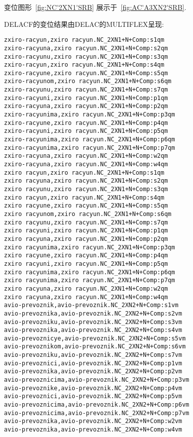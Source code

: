 \bigskip
\noindent 变位图形~\ref{fig:NC'2XN1'SRB} 展示于~\ref{fig:AC'A3XN2'SRB}. 

\bigskip
\noindent DELACF的变位结果由DELAC的MULTIFLEX呈现:

\footnotesize
\begin{verbatim}
zxiro-racyun,zxiro racyun.NC_2XN1+N+Comp:s1qm
zxiro-racyuna,zxiro racyun.NC_2XN1+N+Comp:s2qm
zxiro-racyunu,zxiro racyun.NC_2XN1+N+Comp:s3qm
zxiro-racyun,zxiro racyun.NC_2XN1+N+Comp:s4qm
zxiro-racyune,zxiro racyun.NC_2XN1+N+Comp:s5qm
zxiro-racyunom,zxiro racyun.NC_2XN1+N+Comp:s6qm
zxiro-racyunu,zxiro racyun.NC_2XN1+N+Comp:s7qm
zxiro-racyuni,zxiro racyun.NC_2XN1+N+Comp:p1qm
zxiro-racyuna,zxiro racyun.NC_2XN1+N+Comp:p2qm
zxiro-racyunima,zxiro racyun.NC_2XN1+N+Comp:p3qm
zxiro-racyune,zxiro racyun.NC_2XN1+N+Comp:p4qm
zxiro-racyuni,zxiro racyun.NC_2XN1+N+Comp:p5qm
zxiro-racyunima,zxiro racyun.NC_2XN1+N+Comp:p6qm
zxiro-racyunima,zxiro racyun.NC_2XN1+N+Comp:p7qm
zxiro-racyuna,zxiro racyun.NC_2XN1+N+Comp:w2qm
zxiro-racyuna,zxiro racyun.NC_2XN1+N+Comp:w4qm
zxiro racyun,zxiro racyun.NC_2XN1+N+Comp:s1qm
zxiro racyuna,zxiro racyun.NC_2XN1+N+Comp:s2qm
zxiro racyunu,zxiro racyun.NC_2XN1+N+Comp:s3qm
zxiro racyun,zxiro racyun.NC_2XN1+N+Comp:s4qm
zxiro racyune,zxiro racyun.NC_2XN1+N+Comp:s5qm
zxiro racyunom,zxiro racyun.NC_2XN1+N+Comp:s6qm
zxiro racyunu,zxiro racyun.NC_2XN1+N+Comp:s7qm
zxiro racyuni,zxiro racyun.NC_2XN1+N+Comp:p1qm
zxiro racyuna,zxiro racyun.NC_2XN1+N+Comp:p2qm
zxiro racyunima,zxiro racyun.NC_2XN1+N+Comp:p3qm
zxiro racyune,zxiro racyun.NC_2XN1+N+Comp:p4qm
zxiro racyuni,zxiro racyun.NC_2XN1+N+Comp:p5qm
zxiro racyunima,zxiro racyun.NC_2XN1+N+Comp:p6qm
zxiro racyunima,zxiro racyun.NC_2XN1+N+Comp:p7qm
zxiro racyuna,zxiro racyun.NC_2XN1+N+Comp:w2qm
zxiro racyuna,zxiro racyun.NC_2XN1+N+Comp:w4qm
avio-prevoznik,avio-prevoznik.NC_2XN2+N+Comp:s1vm
avio-prevoznika,avio-prevoznik.NC_2XN2+N+Comp:s2vm
avio-prevozniku,avio-prevoznik.NC_2XN2+N+Comp:s3vm
avio-prevoznika,avio-prevoznik.NC_2XN2+N+Comp:s4vm
avio-prevoznicye,avio-prevoznik.NC_2XN2+N+Comp:s5vm
avio-prevoznikom,avio-prevoznik.NC_2XN2+N+Comp:s6vm
avio-prevozniku,avio-prevoznik.NC_2XN2+N+Comp:s7vm
avio-prevoznici,avio-prevoznik.NC_2XN2+N+Comp:p1vm
avio-prevoznika,avio-prevoznik.NC_2XN2+N+Comp:p2vm
avio-prevoznicima,avio-prevoznik.NC_2XN2+N+Comp:p3vm
avio-prevoznike,avio-prevoznik.NC_2XN2+N+Comp:p4vm
avio-prevoznici,avio-prevoznik.NC_2XN2+N+Comp:p5vm
avio-prevoznicima,avio-prevoznik.NC_2XN2+N+Comp:p6vm
avio-prevoznicima,avio-prevoznik.NC_2XN2+N+Comp:p7vm
avio-prevoznika,avio-prevoznik.NC_2XN2+N+Comp:w2vm
avio-prevoznika,avio-prevoznik.NC_2XN2+N+Comp:w4vm

\end{verbatim}
